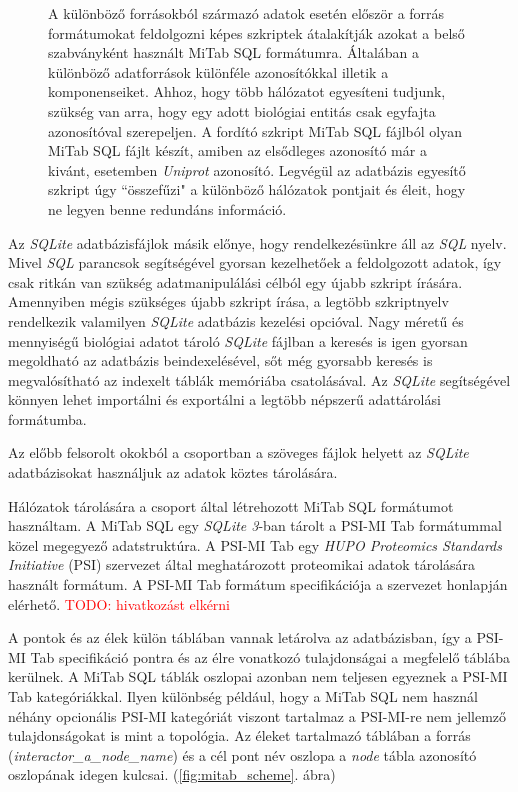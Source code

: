 \documentclass[a4paper,12pt]{article}
\newenvironment{imgdesc}{
		\small
		\singlespacing
		\begin{center}
		
	}{
		\end{center}	
	}
\begin{document}
\begin{figure}[H]
 			 		 \begin{imgdesc}
 				 		 A különböző forrásokból származó adatok esetén először a forrás formátumokat feldolgozni képes szkriptek átalakítják azokat a belső szabványként használt MiTab SQL formátumra. Általában a különböző adatforrások különféle azonosítókkal illetik a komponenseiket. Ahhoz, hogy több hálózatot egyesíteni tudjunk, szükség van arra, hogy egy adott biológiai entitás csak egyfajta azonosítóval szerepeljen. A fordító szkript MiTab SQL fájlból olyan MiTab SQL fájlt készít, amiben az elsődleges azonosító már a kivánt, esetemben \textit{Uniprot} azonosító. Legvégül az adatbázis egyesítő szkript úgy ``összefűzi" a különböző hálózatok pontjait és éleit, hogy ne legyen benne redundáns információ.
 			 		 \end{imgdesc}

			 		 \label{fig:slk3uml}			 		 
			 	 \end{figure}
			 	 



			
		 Az \textit{SQLite} adatbázisfájlok másik előnye, hogy rendelkezésünkre áll az \textit{SQL} nyelv. Mivel \textit{SQL} parancsok segítségével gyorsan kezelhetőek a feldolgozott adatok, így csak ritkán van szükség adatmanipulálási célból egy újabb szkript írására. Amennyiben mégis szükséges újabb szkript írása, a legtöbb szkriptnyelv rendelkezik valamilyen \textit{SQLite} adatbázis kezelési opcióval. Nagy méretű és mennyiségű biológiai adatot tároló \textit{SQLite} fájlban a keresés is igen gyorsan megoldható az adatbázis beindexelésével, sőt még gyorsabb keresés is megvalósítható az indexelt táblák memóriába csatolásával. Az \textit{SQLite} segítségével könnyen lehet importálni és exportálni a legtöbb népszerű adattárolási formátumba.
			
		Az előbb felsorolt okokból a csoportban a szöveges fájlok helyett az \textit{SQLite} adatbázisokat használjuk az adatok köztes tárolására. 
		
		Hálózatok tárolására a csoport által létrehozott MiTab SQL formátumot használtam. A MiTab SQL egy \textit{SQLite 3}-ban tárolt a PSI-MI Tab formátummal közel megegyező adatstruktúra. A PSI-MI Tab egy \textit{HUPO Proteomics Standards Initiative} (PSI) szervezet által meghatározott proteomikai adatok tárolására használt formátum. A PSI-MI Tab formátum specifikációja a szervezet honlapján elérhető. \textcolor{red}{TODO: hivatkozást elkérni}
		
		A pontok és az élek külön táblában vannak letárolva az adatbázisban, így a PSI-MI Tab specifikáció pontra és az élre vonatkozó tulajdonságai a megfelelő táblába kerülnek. A MiTab SQL táblák oszlopai azonban nem teljesen egyeznek a PSI-MI Tab kategóriákkal. Ilyen különbség például, hogy a MiTab SQL nem használ néhány opcionális PSI-MI kategóriát viszont tartalmaz a PSI-MI-re nem jellemző tulajdonságokat is mint a topológia. Az éleket tartalmazó táblában a forrás (\textit{interactor\_a\_node\_name}) és a cél pont név oszlopa a \textit{node} tábla azonosító oszlopának idegen kulcsai. (\ref{fig:mitab_scheme}. ábra)
			
\end{document}
